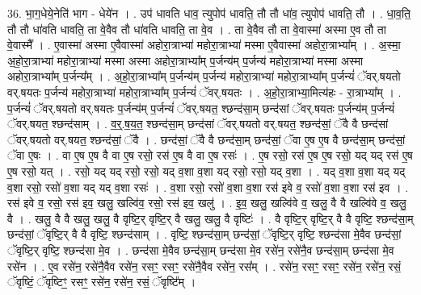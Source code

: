\documentclass[17pt]{extarticle}
\begin{document}
36. भा॒ग॒धेये॒नेति॑ भाग - धेये॑न । . उप॑ धावति धाव॒ त्युपोप॑ धावति॒ तौ तौ धा॑व॒ त्युपोप॑ धावति॒ तौ । . धा॒व॒ति॒ तौ तौ धा॑वति धावति॒ ता वे॒वैव तौ धा॑वति धावति॒ ता वे॒व । . ता वे॒वैव तौ ता वे॒वास्मा॑ अस्मा ए॒व तौ ता वे॒वास्मै᳚ । . ए॒वास्मा॑ अस्मा ए॒वैवास्मा॑ अहोरा॒त्राभ्या॑ महोरा॒त्राभ्या॑ मस्मा ए॒वैवास्मा॑ अहोरा॒त्राभ्या᳚म् । . अ॒स्मा॒ अ॒हो॒रा॒त्राभ्या॑ महोरा॒त्राभ्या॑ मस्मा अस्मा अहोरा॒त्राभ्या᳚म् प॒र्जन्य॑म् प॒र्जन्य॑ महोरा॒त्राभ्या॑ मस्मा अस्मा अहोरा॒त्राभ्या᳚म् प॒र्जन्य᳚म् । . अ॒हो॒रा॒त्राभ्या᳚म् प॒र्जन्य॑म् प॒र्जन्य॑ महोरा॒त्राभ्या॑ महोरा॒त्राभ्या᳚म् प॒र्जन्यं॑ ॅवर्.षयतो वर्.षयतः प॒र्जन्य॑ महोरा॒त्राभ्या॑ महोरा॒त्राभ्या᳚म् प॒र्जन्यं॑ ॅवर्.षयतः । . अ॒हो॒रा॒त्राभ्या॒मित्य॑हः - रा॒त्राभ्या᳚म् । . प॒र्जन्यं॑ ॅवर्.षयतो वर्.षयतः प॒र्जन्य॑म् प॒र्जन्यं॑ ॅवर्.षयत॒ श्छन्द॑सा॒म् छन्द॑सां ॅवर्.षयतः प॒र्जन्य॑म् प॒र्जन्यं॑ ॅवर्.षयत॒ श्छन्द॑साम् । . व॒र्॒.ष॒य॒त॒ श्छन्द॑सा॒म् छन्द॑सां ॅवर्.षयतो वर्.षयत॒ श्छन्द॑सां॒ ॅवै वै छन्द॑सां ॅवर्.षयतो वर्.षयत॒ श्छन्द॑सां॒ ॅवै । . छन्द॑सां॒ ॅवै वै छन्द॑सा॒म् छन्द॑सां॒ ॅवा ए॒ष ए॒ष वै छन्द॑सा॒म् छन्द॑सां॒ ॅवा ए॒षः । . वा ए॒ष ए॒ष वै वा ए॒ष रसो॒ रस॑ ए॒ष वै वा ए॒ष रसः॑ । . ए॒ष रसो॒ रस॑ ए॒ष ए॒ष रसो॒ यद् यद् रस॑ ए॒ष ए॒ष रसो॒ यत् । . रसो॒ यद् यद् रसो॒ रसो॒ यद् व॒शा व॒शा यद् रसो॒ रसो॒ यद् व॒शा । . यद् व॒शा व॒शा यद् यद् व॒शा रसो॒ रसो॑ व॒शा यद् यद् व॒शा रसः॑ । . व॒शा रसो॒ रसो॑ व॒शा व॒शा रस॑ इवे व॒ रसो॑ व॒शा व॒शा रस॑ इव । . रस॑ इवे व॒ रसो॒ रस॑ इव॒ खलु॒ खल्वि॑व॒ रसो॒ रस॑ इव॒ खलु॑ । . इ॒व॒ खलु॒ खल्वि॑वे व॒ खलु॒ वै वै खल्वि॑वे व॒ खलु॒ वै । . खलु॒ वै वै खलु॒ खलु॒ वै वृष्टि॒र् वृष्टि॒र् वै खलु॒ खलु॒ वै वृष्टिः॑ । . वै वृष्टि॒र् वृष्टि॒र् वै वै वृष्टि॒ श्छन्द॑सा॒म् छन्द॑सां॒ ॅवृष्टि॒र् वै वै वृष्टि॒ श्छन्द॑साम् । . वृष्टि॒ श्छन्द॑सा॒म् छन्द॑सां॒ ॅवृष्टि॒र् वृष्टि॒ श्छन्द॑सा मे॒वैव छन्द॑सां॒ ॅवृष्टि॒र् वृष्टि॒ श्छन्द॑सा मे॒व । . छन्द॑सा मे॒वैव छन्द॑सा॒म् छन्द॑सा मे॒व रसे॑न॒ रसे॑नै॒व छन्द॑सा॒म् छन्द॑सा मे॒व रसे॑न । . ए॒व रसे॑न॒ रसे॑नै॒वैव रसे॑न॒ रसꣳ॒॒ रसꣳ॒॒ रसे॑नै॒वैव रसे॑न॒ रस᳚म् । . रसे॑न॒ रसꣳ॒॒ रसꣳ॒॒ रसे॑न॒ रसे॑न॒ रसं॒ ॅवृष्टिं॒ ॅवृष्टिꣳ॒॒ रसꣳ॒॒ रसे॑न॒ रसे॑न॒ रसं॒ ॅवृष्टि᳚म् । \newline
\pagebreak
{}
\end{document}
